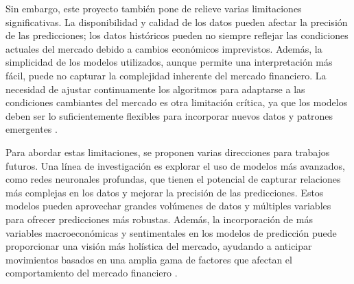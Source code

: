 Sin embargo, este proyecto también pone de relieve varias limitaciones significativas. La disponibilidad y calidad de los datos pueden afectar la precisión de las predicciones; los datos históricos pueden no siempre reflejar las condiciones actuales del mercado debido a cambios económicos imprevistos. Además, la simplicidad de los modelos utilizados, aunque permite una interpretación más fácil, puede no capturar la complejidad inherente del mercado financiero. La necesidad de ajustar continuamente los algoritmos para adaptarse a las condiciones cambiantes del mercado es otra limitación crítica, ya que los modelos deben ser lo suficientemente flexibles para incorporar nuevos datos y patrones emergentes \cite{b1}.

Para abordar estas limitaciones, se proponen varias direcciones para trabajos futuros. Una línea de investigación es explorar el uso de modelos más avanzados, como redes neuronales profundas, que tienen el potencial de capturar relaciones más complejas en los datos y mejorar la precisión de las predicciones. Estos modelos pueden aprovechar grandes volúmenes de datos y múltiples variables para ofrecer predicciones más robustas. Además, la incorporación de más variables macroeconómicas y sentimentales en los modelos de predicción puede proporcionar una visión más holística del mercado, ayudando a anticipar movimientos basados en una amplia gama de factores que afectan el comportamiento del mercado financiero \cite{b4}.








